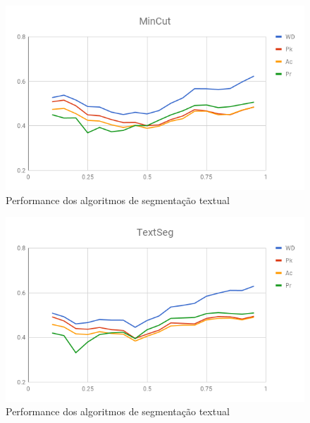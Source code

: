 
  \begin{figure}[!h]
	  \centering
	  \includegraphics[width=1\textwidth]{conteudo/capitulos/figs/graficos/analiseNSegRate-MinCut.png}
	  \caption{Performance dos algoritmos de segmentação textual}
	  \label{fig:grafico-medidas-tradicionais}
  \end{figure}


  \begin{figure}[!h]
	  \centering
	  \includegraphics[width=1\textwidth]{conteudo/capitulos/figs/graficos/analiseNSegRate-UISeg.png}
	  \caption{Performance dos algoritmos de segmentação textual}
	  \label{fig:grafico-medidas-tradicionais}
  \end{figure}

